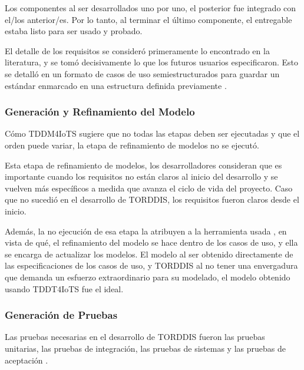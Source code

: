 \documentclass[a4paper,fleqn]{cas-sc}
\begin{document}
				Los componentes al ser desarrollados uno por uno, el posterior fue integrado con el/los anterior/es. Por lo tanto, al terminar el último componente, el entregable estaba listo para ser usado y probado.
				
				El detalle de los requisitos se consideró primeramente lo encontrado en la literatura, y se tomó decisivamente lo que los futuros usuarios especificaron. Esto se detalló en un formato de casos de uso semiestructurados para guardar un estándar enmarcado en una estructura definida previamente \citep{Zegzhda2018Use}.
				
			\subsubsection{Generación y Refinamiento del Modelo}
				Cómo TDDM4IoTS \citep{Guerrero-Ulloa2020TDDM4IoTS} sugiere que no todas las etapas deben ser ejecutadas y que el orden puede variar, la etapa de refinamiento de modelos no se ejecutó.
				
				Esta etapa de refinamiento de modelos, los desarrolladores consideran que es importante cuando los requisitos no están claros al inicio del desarrollo y se vuelven más específicos a medida que avanza el ciclo de vida del proyecto. Caso que no sucedió en el desarrollo de TORDDIS, los requisitos fueron claros desde el inicio.
				
				Además, la no ejecución de esa etapa la atribuyen a la herramienta usada \citep{Guerrero2024Test}, en vista de qué, el refinamiento del modelo se hace dentro de los casos de uso, y ella se encarga de actualizar los modelos. El modelo al ser obtenido directamente de las especificaciones de los casos de uso, y TORDDIS al no tener una envergadura que demanda un esfuerzo extraordinario para su modelado, el modelo obtenido usando TDDT4IoTS fue el ideal.
				
			\subsubsection{Generación de Pruebas}
				Las pruebas necesarias en el desarrollo de TORDDIS fueron las pruebas unitarias, las pruebas de integración, las pruebas de sistemas y las pruebas de aceptación \citep{Sciarra2024Smash}.
				
\end{document}
